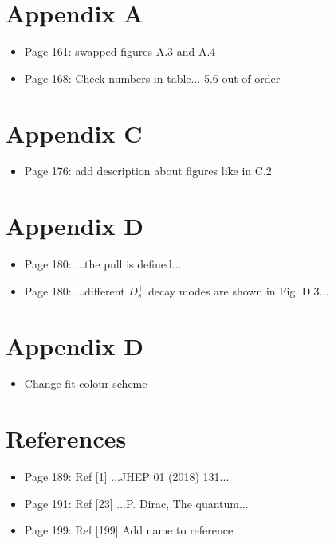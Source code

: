 \documentclass[12pt]{article}
\begin{document}
\section{Appendix A}

\begin{itemize}
\item Page 161: swapped figures A.3 and A.4
\item Page 168: {\color{blue} Check numbers in table... 5.6 out of order}

\end{itemize}
\section{Appendix C}

\begin{itemize}
\item Page 176: {\color{blue} add description about figures like in C.2}



\end{itemize}
\section{Appendix D}

\begin{itemize}
\item Page 180: ...the {\color{red}pull} is defined...  
\item Page 180: ...different $D_s^+$ decay modes are shown in {\color{red}Fig. D.3}...


\end{itemize}
\section{Appendix D}

\begin{itemize}
\item {\color{blue} Change fit colour scheme}

\end{itemize}
\section{References}


\begin{itemize}
\item Page 189: Ref [1] ...JHEP 01 (2018) {\color{red}131}...
\item Page 191: Ref [23] ...{\color{red}P. Dirac}, The quantum...
\item Page 199: Ref [199]  Add name to reference




\end{itemize}
\end{document}
